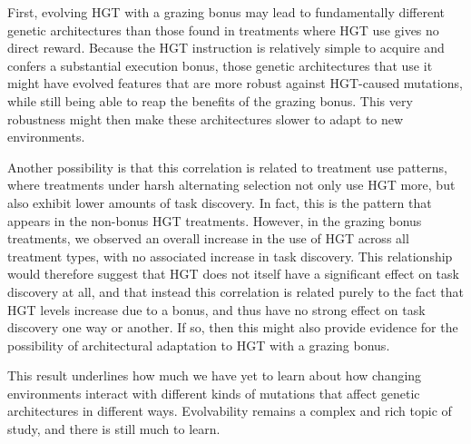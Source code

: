 \documentclass[PhD]{msu-thesis}
\begin{document}
First, evolving HGT with a grazing bonus may lead to fundamentally different genetic architectures than those found in treatments where HGT use gives no direct reward. Because the HGT instruction is relatively simple to acquire and confers a substantial execution bonus, those genetic architectures that use it might have evolved features that are more robust against HGT-caused mutations, while still being able to reap the benefits of the grazing bonus. This very robustness might then make these architectures slower to adapt to new environments. 

Another possibility is that this correlation is related to treatment use patterns, where treatments under harsh alternating selection not only use HGT more, but also exhibit lower amounts of task discovery. In fact, this is the pattern that appears in the non-bonus HGT treatments. However, in the grazing bonus treatments, we observed an overall increase in the use of HGT across all treatment types, with no associated increase in task discovery. This relationship would therefore suggest that HGT does not itself have a significant effect on task discovery at all, and that instead this correlation is related purely to the fact that HGT levels increase due to a bonus, and thus have no strong effect on task discovery one way or another. If so, then this might also provide evidence for the possibility of architectural adaptation to HGT with a grazing bonus.

This result underlines how much we have yet to learn about how changing environments interact with different kinds of mutations that affect genetic architectures in different ways. Evolvability remains a complex and rich topic of study, and there is still much to learn.
\end{document}
